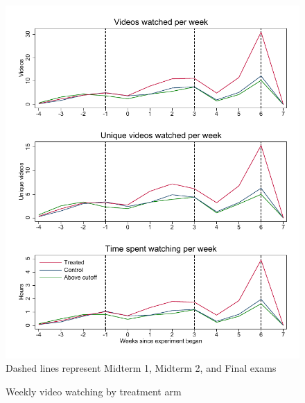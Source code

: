 \documentclass[12pt]{article}
\begin{document}
\clearpage
\begin{figure}[t]
\begin{center}
\caption{Weekly video watching by treatment arm}
\label{timeseries}
\includegraphics[width=1\textwidth, angle=0]{../plots/tscombo}
\footnotesize Dashed lines represent Midterm 1, Midterm 2, and Final exams
\end{center}
\end{figure}
\end{document}
